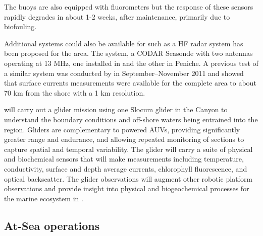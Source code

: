 The buoys are also equipped with fluorometers but the response of these
sensors rapidly degrades in about 1-2 weeks, after maintenance,
primarily due to biofouling.

Additional systems could also be available for \proj such as %
a HF radar system has been proposed for the \naz area. The system, a
CODAR Seasonde with two antennas operating at 13 MHz, one installed in
\naz and the other in Peniche. A previous test of a similar system was
conducted by \inst in September--November 2011 and showed that surface
currents measurements were available for the complete area to about 70
km from the shore with a 1 km resolution.

\soc will carry out a glider mission using one Slocum glider in the
\naz Canyon to understand the boundary conditions and off-shore waters
being entrained into the region. %
Gliders are complementary to powered AUVs, providing significantly
greater range and endurance, and allowing repeated monitoring of sections
to capture spatial and temporal variability. %
The \soc glider will carry a suite of physical and biochemical sensors
that will make measurements including temperature, conductivity,
surface and depth average currents, chlorophyll fluorescence, and
optical backscatter. The glider observations will augment other
robotic platform observations and provide insight into physical and
biogeochemical processes for the marine ecosystem in
\naze. %

  
\subsection{At-Sea operations}

